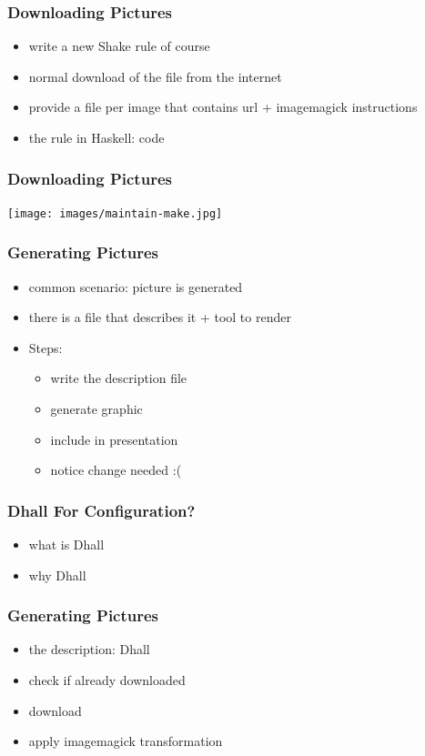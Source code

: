 \documentclass{beamer}
\begin{document}
\begin{frame}
  \frametitle{Downloading Pictures}
  \begin{itemize}
  \item write a new Shake rule of course
  \item normal download of the file from the internet
  \item provide a file per image that contains url + imagemagick instructions
  \item the rule in Haskell: code
  \end{itemize}
\end{frame}

\begin{frame}
  \frametitle{Downloading Pictures}
  \texttt{[image: images/maintain-make.jpg]}
\end{frame}

\begin{frame}
  \frametitle{Generating Pictures}
  \begin{itemize}
  \item common scenario: picture is generated
  \item there is a file that describes it + tool to render
  \item Steps:
    \begin{itemize}
    \item write the description file
    \item generate graphic
    \item include in presentation
    \item notice change needed :(
    \end{itemize}
  \end{itemize}
\end{frame}

\begin{frame}
  \frametitle{Dhall For Configuration?}
  \begin{itemize}
  \item what is Dhall
  \item why Dhall
  \end{itemize}
\end{frame}

\begin{frame}
  \frametitle{Generating Pictures}
  \begin{itemize}
  \item the description: Dhall
  \item check if already downloaded
  \item download
  \item apply imagemagick transformation
  \end{itemize}
\end{frame}
\end{document}
